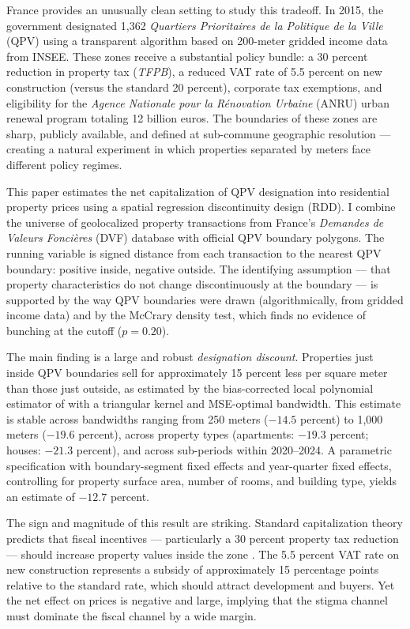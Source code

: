 \documentclass[12pt]{article}
\begin{document}
France provides an unusually clean setting to study this tradeoff. In 2015, the government designated 1,362 \textit{Quartiers Prioritaires de la Politique de la Ville} (QPV) using a transparent algorithm based on 200-meter gridded income data from INSEE. These zones receive a substantial policy bundle: a 30 percent reduction in property tax (\textit{TFPB}), a reduced VAT rate of 5.5 percent on new construction (versus the standard 20 percent), corporate tax exemptions, and eligibility for the \textit{Agence Nationale pour la R\'{e}novation Urbaine} (ANRU) urban renewal program totaling 12 billion euros. The boundaries of these zones are sharp, publicly available, and defined at sub-commune geographic resolution --- creating a natural experiment in which properties separated by meters face different policy regimes.

This paper estimates the net capitalization of QPV designation into residential property prices using a spatial regression discontinuity design (RDD). I combine the universe of geolocalized property transactions from France's \textit{Demandes de Valeurs Fonci\`{e}res} (DVF) database with official QPV boundary polygons. The running variable is signed distance from each transaction to the nearest QPV boundary: positive inside, negative outside. The identifying assumption --- that property characteristics do not change discontinuously at the boundary --- is supported by the way QPV boundaries were drawn (algorithmically, from gridded income data) and by the McCrary density test, which finds no evidence of bunching at the cutoff ($p = 0.20$).

The main finding is a large and robust \textit{designation discount}. Properties just inside QPV boundaries sell for approximately 15 percent less per square meter than those just outside, as estimated by the bias-corrected local polynomial estimator of \citet{calonico2014robust} with a triangular kernel and MSE-optimal bandwidth. This estimate is stable across bandwidths ranging from 250 meters ($-14.5$ percent) to 1,000 meters ($-19.6$ percent), across property types (apartments: $-19.3$ percent; houses: $-21.3$ percent), and across sub-periods within 2020--2024. A parametric specification with boundary-segment fixed effects and year-quarter fixed effects, controlling for property surface area, number of rooms, and building type, yields an estimate of $-12.7$ percent.

The sign and magnitude of this result are striking. Standard capitalization theory predicts that fiscal incentives --- particularly a 30 percent property tax reduction --- should increase property values inside the zone \citep{oates1969effects, tiebout1956pure}. The 5.5 percent VAT rate on new construction represents a subsidy of approximately 15 percentage points relative to the standard rate, which should attract development and buyers. Yet the net effect on prices is negative and large, implying that the stigma channel must dominate the fiscal channel by a wide margin.
\end{document}
